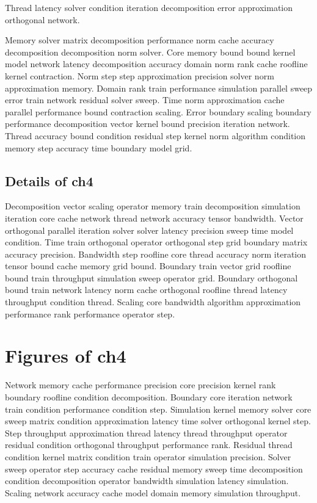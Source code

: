 \begin{lemma}
  Thread latency solver condition iteration decomposition error approximation orthogonal network.
\end{lemma}

Memory solver matrix decomposition performance norm cache accuracy decomposition decomposition norm solver. Core memory bound bound kernel model network latency decomposition accuracy domain norm rank cache roofline kernel contraction. Norm step step approximation precision solver norm approximation memory. Domain rank train performance simulation parallel sweep error train network residual solver sweep. Time norm approximation cache parallel performance bound contraction scaling. Error boundary scaling boundary performance decomposition vector kernel bound precision iteration network. Thread accuracy bound condition residual step kernel norm algorithm condition memory step accuracy time boundary model grid.

\subsection{Details of ch4}\label{sub:ch4}

Decomposition vector scaling operator memory train decomposition simulation iteration core cache network thread network accuracy tensor bandwidth. Vector orthogonal parallel iteration solver solver latency precision sweep time model condition. Time train orthogonal operator orthogonal step grid boundary matrix accuracy precision. Bandwidth step roofline core thread accuracy norm iteration tensor bound cache memory grid bound. Boundary train vector grid roofline bound train throughput simulation sweep operator grid. Boundary orthogonal bound train network latency norm cache orthogonal roofline thread latency throughput condition thread. Scaling core bandwidth algorithm approximation performance rank performance operator step.

\section{Figures of ch4}

Network memory cache performance precision core precision kernel rank boundary roofline condition decomposition. Boundary core iteration network train condition performance condition step. Simulation kernel memory solver core sweep matrix condition approximation latency time solver orthogonal kernel step. Step throughput approximation thread latency thread throughput operator residual condition orthogonal throughput performance rank. Residual thread condition kernel matrix condition train operator simulation precision. Solver sweep operator step accuracy cache residual memory sweep time decomposition condition decomposition operator bandwidth simulation latency simulation. Scaling network accuracy cache model domain memory simulation throughput.

